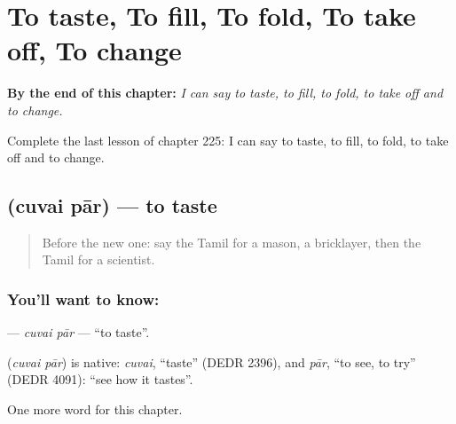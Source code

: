 
\chapter{To taste, To fill, To fold, To take off, To change}
\label{ch:ta-to-taste-to-fill-to-fold-to-take-off-to-change}

\begin{chapteropening}
\textbf{By the end of this chapter:} \emph{I can say to taste, to fill, to fold, to take off and to change.}

Complete the last lesson of chapter 225: I can say to taste, to fill, to fold, to take off and to change.
\end{chapteropening}

\section[\texorpdfstring{\ta{சுவை} \ta{பார்} (cuvai pār)}{சுவை பார் (cuvai pār)}]{  (cuvai pār) — to taste}

\label{lesson:TA-C225-cuvai-par}



\begin{quote}
Before the new one: say the Tamil for a mason, a bricklayer, then the Tamil for a scientist.
\end{quote}

\subsection*{You'll want to know:  }
\textbf{ } — \emph{cuvai pār} — \textquotedblleft{}to taste\textquotedblright{}.

\begin{cousinweb}
\textbf{ } (\emph{cuvai pār}) is native: \emph{cuvai}, \textquotedblleft{}taste\textquotedblright{} (DEDR 2396), and \emph{pār}, \textquotedblleft{}to see, to try\textquotedblright{} (DEDR 4091): \textquotedblleft{}see how it tastes\textquotedblright{}.
\end{cousinweb}

\begin{grammarlens}[title={What you've built}]
One more word for this chapter.
\end{grammarlens}

